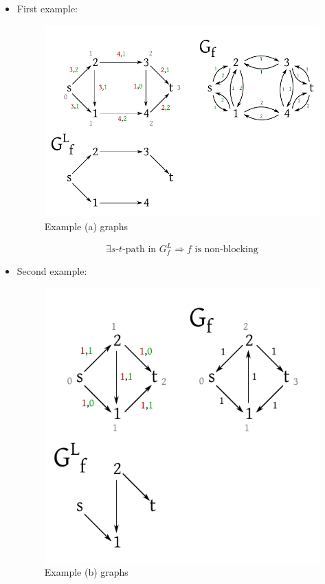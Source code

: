 \documentclass[a4paper]{article}
\theoremstyle{definition}
\newcommand{\gath}[2]{$#1$-$#2$-path} %
\begin{document}
\begin{itemize}
  \item First example:
    \begin{figure}[!ht]
      \begin{center}
       \includegraphics{img/blocking_flows_a.pdf}
       \caption{Example (a) graphs}
      \end{center}
    \end{figure}

    \[
      \exists \text{\gath st in }  G^L_f
        \Rightarrow f \text{ is non-blocking}
    \]

  \item Second example:
    \begin{figure}[!ht]
      \begin{center}
       \includegraphics{img/blocking_flows_b.pdf}
       \caption{Example (b) graphs}
      \end{center}
    \end{figure}


\end{itemize}
\end{document}
